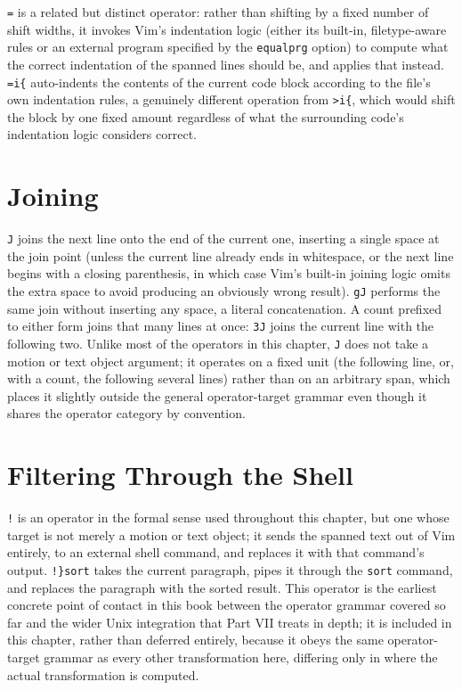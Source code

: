 \texttt{=} is a related but distinct operator: rather than shifting by a fixed number of shift widths, it invokes Vim's indentation logic (either its built-in, filetype-aware rules or an external program specified by the \texttt{equalprg} option) to compute what the correct indentation of the spanned lines should be, and applies that instead. \texttt{=i\{} auto-indents the contents of the current code block according to the file's own indentation rules, a genuinely different operation from \texttt{>i\{}, which would shift the block by one fixed amount regardless of what the surrounding code's indentation logic considers correct.

\section{Joining}

\texttt{J} joins the next line onto the end of the current one, inserting a single space at the join point (unless the current line already ends in whitespace, or the next line begins with a closing parenthesis, in which case Vim's built-in joining logic omits the extra space to avoid producing an obviously wrong result). \texttt{gJ} performs the same join without inserting any space, a literal concatenation. A count prefixed to either form joins that many lines at once: \texttt{3J} joins the current line with the following two. Unlike most of the operators in this chapter, \texttt{J} does not take a motion or text object argument; it operates on a fixed unit (the following line, or, with a count, the following several lines) rather than on an arbitrary span, which places it slightly outside the general operator-target grammar even though it shares the operator category by convention.

\section{Filtering Through the Shell}

\texttt{!} is an operator in the formal sense used throughout this chapter, but one whose target is not merely a motion or text object; it sends the spanned text out of Vim entirely, to an external shell command, and replaces it with that command's output. \texttt{!\}sort} takes the current paragraph, pipes it through the \texttt{sort} command, and replaces the paragraph with the sorted result. This operator is the earliest concrete point of contact in this book between the operator grammar covered so far and the wider Unix integration that Part VII treats in depth; it is included in this chapter, rather than deferred entirely, because it obeys the same operator-target grammar as every other transformation here, differing only in where the actual transformation is computed.

